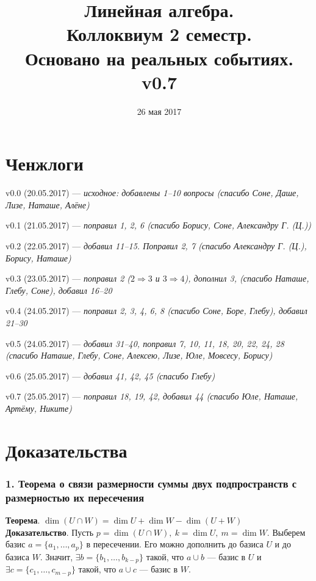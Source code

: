 \documentclass[a4paper, 12pt]{article}
\begin{document}
\title{Линейная алгебра.\\ Коллоквиум 2 семестр.\\ Основано на реальных событиях.\\ v0.7}
\date{26 мая 2017}

\maketitle

\part*{Ченжлоги}
v0.0 (20.05.2017) --- \textit{исходное: добавлены 1--10 вопросы (спасибо Соне, Даше, Лизе, Наташе, Алёне)}

v0.1 (21.05.2017) --- \textit{поправил 1, 2, 6 (спасибо Борису, Соне, Александру Г. (Ц.))}

v0.2 (22.05.2017) --- \textit{добавил 11--15. Поправил 2, 7 (спасибо Александру Г. (Ц.), Борису, Наташе)}

v0.3 (23.05.2017) --- \textit{поправил 2 ($2 \Rightarrow 3$ и $3 \Rightarrow 4$), дополнил 3, (спасибо Наташе, Глебу, Соне), добавил 16--20}

v0.4 (24.05.2017) --- \textit{поправил 2, 3, 4, 6, 8 (спасибо Соне, Боре, Глебу), добавил 21--30}

v0.5 (24.05.2017) --- \textit{добавил 31--40, поправил 7, 10, 11, 18, 20, 22, 24, 28 (спасибо Наташе, Глебу, Соне, Алексею, Лизе, Юле, Мовсесу, Борису)}

v0.6 (25.05.2017) --- \textit{добавил 41, 42, 45 (спасибо Глебу)}

v0.7 (25.05.2017) --- \textit{поправил 18, 19, 42, добавил 44 (спасибо Юле, Наташе, Артёму, Никите)}

\part*{Доказательства}

\section*{1. Теорема о связи размерности суммы двух подпространств с размерностью их пересечения}
\noindent \textbf{Теорема}. $\dim(U \cap W) = \dim U + \dim W - \dim (U + W)$ \\
\noindent \textbf{Доказательство}. Пусть $p = \dim (U \cap W),\ k = \dim U,\ m = \dim W$. Выберем базис $a = \{a_1, \ldots, a_p\}$ в пересечении. Его можно дополнить до базиса $U$ и до базиса $W$. Значит, $\exists b = \{b_1, \ldots, b_{k - p}\}$ такой, что $a \cup b$ --- базис в $U$ и $\exists c = \{c_1, \ldots, c_{m - p}\}$ такой, что $a \cup c$ --- базис в $W$.
\end{document}
